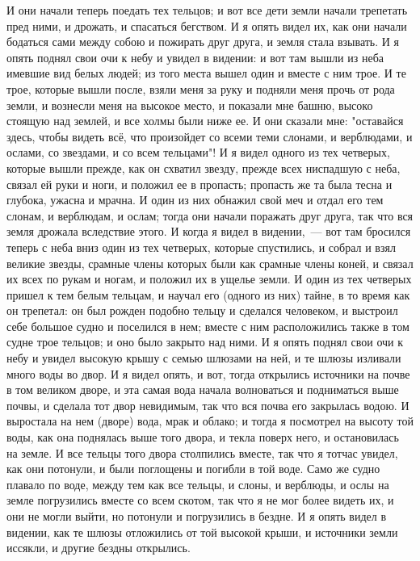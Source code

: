 И они начали теперь поедать тех тельцов; и вот все дети земли начали
трепетать пред ними, и дрожать, и спасаться бегством.
И я опять видел их, как они начали бодаться сами между собою и
пожирать друг друга, и земля стала взывать.
И я опять поднял свои очи к небу и увидел в видении: и вот там вышли
из неба имевшие вид белых людей; из того места вышел один и вместе с ним трое.
И те трое, которые вышли после, взяли меня за руку и подняли меня
прочь от рода земли, и вознесли меня на высокое место, и показали мне башню,
высоко стоящую над землей, и все холмы были ниже ее.
И они сказали мне: "оставайся здесь, чтобы видеть всё, что произойдет
со всеми теми слонами, и верблюдами, и ослами, со звездами, и со всем
тельцами"!
И я видел одного из тех четверых, которые вышли прежде, как он
схватил звезду, прежде всех ниспадшую с неба, связал ей руки и ноги, и положил
ее в пропасть; пропасть же та была тесна и глубока, ужасна и мрачна.
И один из них обнажил свой меч и отдал его тем слонам, и верблюдам, и
ослам; тогда они начали поражать друг друга, так что вся земля дрожала
вследствие этого.
И когда я видел в видении,~--- вот там бросился теперь с неба вниз один
из тех четверых, которые спустились, и собрал и взял великие звезды, срамные
члены которых были как срамные члены коней, и связал их всех по рукам и ногам,
и положил их в ущелье земли.
И один из тех четверых пришел к тем белым тельцам, и научал его
(одного из них) тайне, в то время как он трепетал: он был рожден подобно тельцу
и сделался человеком, и выстроил себе большое судно и поселился в нем; вместе с
ним расположились также в том судне трое тельцов; и оно было закрыто над ними.
И я опять поднял свои очи к небу и увидел высокую крышу с семью
шлюзами на ней, и те шлюзы изливали много воды во двор.
И я видел опять, и вот, тогда открылись источники на почве в том
великом дворе, и эта самая вода начала волноваться и подниматься выше почвы, и
сделала тот двор невидимым, так что вся почва его закрылась водою.
И выростала на нем (дворе) вода, мрак и облако; и тогда я посмотрел на
высоту той воды, как она поднялась выше того двора, и текла поверх него, и
остановилась на земле.
И все тельцы того двора столпились вместе, так что я тотчас увидел,
как они потонули, и были поглощены и погибли в той воде.
Само же судно плавало по воде, между тем как все тельцы, и слоны, и
верблюды, и ослы на земле погрузились вместе со всем скотом, так что я не мог
более видеть их, и они не могли выйти, но потонули и погрузились в бездне.
И я опять видел в видении, как те шлюзы отложились от той высокой
крыши, и источники земли иссякли, и другие бездны открылись.
